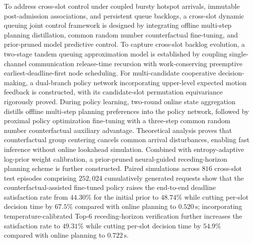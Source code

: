 \begin{abstract*}
To address cross-slot control under coupled bursty hotspot arrivals, immutable post-admission associations, and persistent queue backlogs, a cross-slot dynamic queuing joint control framework is designed by integrating offline multi-step planning distillation, common random number counterfactual fine-tuning, and prior-pruned model predictive control. To capture cross-slot backlog evolution, a two-stage tandem queuing approximation model is established by coupling single-channel communication release-time recursion with work-conserving preemptive earliest-deadline-first node scheduling. For multi-candidate cooperative decision-making, a dual-branch policy network incorporating upper-level expected motion feedback is constructed, with its candidate-slot permutation equivariance rigorously proved. During policy learning, two-round online state aggregation distills offline multi-step planning preferences into the policy network, followed by proximal policy optimization fine-tuning with a three-step common random number counterfactual auxiliary advantage. Theoretical analysis proves that counterfactual group centering cancels common arrival disturbances, enabling fast inference without online lookahead simulation. Combined with entropy-adaptive log-prior weight calibration, a prior-pruned neural-guided receding-horizon planning scheme is further constructed. Paired simulations across $816$ cross-slot test episodes comprising $252{,}024$ cumulatively generated requests show that the counterfactual-assisted fine-tuned policy raises the end-to-end deadline satisfaction rate from $44.30\%$ for the initial prior to $48.74\%$ while cutting per-slot decision time by $67.5\%$ compared with online planning to $0.520\,\mathrm{s}$; incorporating temperature-calibrated Top-$6$ receding-horizon verification further increases the satisfaction rate to $49.31\%$ while cutting per-slot decision time by $54.9\%$ compared with online planning to $0.722\,\mathrm{s}$.
\end{abstract*}
